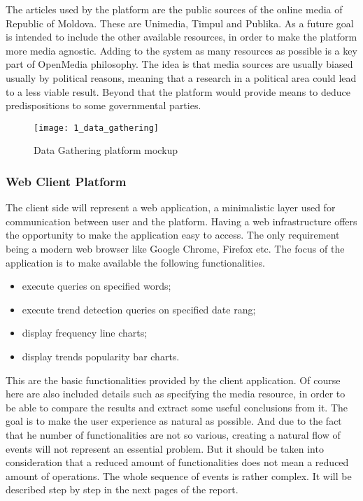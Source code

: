 The articles used by the platform are the public sources of the online media of Republic of Moldova. These are Unimedia, Timpul and Publika. As a future goal is intended to include the other available resources, in order to make the platform more media agnostic. Adding to the system as many resources as possible is a key part of OpenMedia philosophy. The idea is that media sources are usually biased usually by political reasons, meaning that a research in a political area could lead to a less viable result. Beyond that the platform would provide means to deduce predispositions to some governmental parties.

\begin{figure}[!ht]
\centering
\texttt{[image: 1\_data\_gathering]}
\caption{Data Gathering platform mockup}\label{data_gathering_mock}
\end{figure}

\subsubsection{Web Client Platform}
The client side will represent a web application, a minimalistic layer used for communication between user and the platform. Having a web infrastructure offers the opportunity to make the application easy to access. The only requirement being a modern web browser like Google Chrome, Firefox etc. The focus of the application is to make available the following functionalities.
\begin{itemize}
    \item execute queries on specified words;
    \item execute trend detection queries on specified date rang;
    \item display frequency line charts;
    \item display trends popularity bar charts.
\end{itemize}

This are the basic functionalities provided by the client application. Of course here are also included details such as specifying the media resource, in order to be able to compare the results and extract some useful conclusions from it. The goal is to make the user experience as natural as possible. And due to the fact that he number of functionalities are not so various, creating a natural flow of events will not represent an essential problem. But it should be taken into consideration that a reduced amount of functionalities does not mean a reduced amount of operations. The whole sequence of events is rather complex. It will be described step by step in the next pages of the report.

